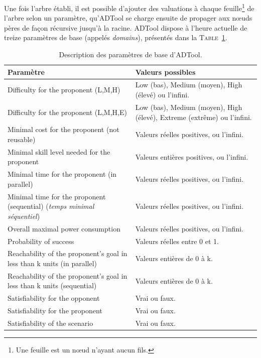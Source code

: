     Une fois l'arbre établi, il est possible d'ajouter des valuations à chaque feuille\footnote{Une feuille est un nœud n'ayant aucun fils.} de l'arbre selon un paramètre, qu'ADTool se charge ensuite de propager aux nœuds pères de façon récursive jusqu'à la racine. ADTool dispose à l'heure actuelle de treize paramètres de base (appelés \textit{domains}), présentés dans la \textsc{Table}~\ref{tab:DescriptionParam}.
                    
    \begin{table}[h]
        \centering
        \begin{tabular}{|p{6cm}|p{5cm}|}
            \hline
            \textbf{Paramètre} & \textbf{Valeurs possibles} \\
            \hline
            Difficulty for the proponent (L,M,H) & 
                Low (bas), Medium (moyen), High (élevé) ou l'infini.\\ 
            \hline
            Difficulty for the proponent (L,M,H,E) & 
                Low (bas), Medium (moyen), High (élevé), Extreme (extrême) ou l'infini.\\ 
            \hline
            Minimal cost for the proponent (not reusable) & 
                Valeurs réelles positives, ou l'infini.\\ 
            \hline
            Minimal skill level needed for the proponent & 
                Valeurs entières positives, ou l'infini.\\ 
            \hline
            Minimal time for the proponent (in parallel) & 
                Valeurs réelles positives, ou l'infini.\\ 
            \hline
            Minimal time for the proponent (sequential) (\textit{temps minimal séquentiel}) & 
                Valeurs réelles positives, ou l'infini.\\ 
            \hline
            Overall maximal power consumption & 
                Valeurs réelles positives, ou l'infini.\\ 
            \hline
            Probability of success &
                Valeurs réelles entre 0 et 1.\\ 
            \hline
            Reachability of the proponent's goal in less than k units (in parallel) & 
                Valeurs entières de 0 à k. \\ 
            \hline
            Reachability of the proponent's goal in less than k units (sequential) & 
                Valeurs entières de 0 à k. \\ 
            \hline
            Satisfiability for the opponent & 
                Vrai ou faux. \\ 
            \hline
            Satisfiability for the proponent & 
                Vrai ou faux. \\ 
            \hline
            Satisfiability of the scenario & 
                Vrai ou faux. \\
            \hline
        \end{tabular}
        \caption{Description des paramètres de base d'ADTool.}
        \label{tab:DescriptionParam}
    \end{table}

